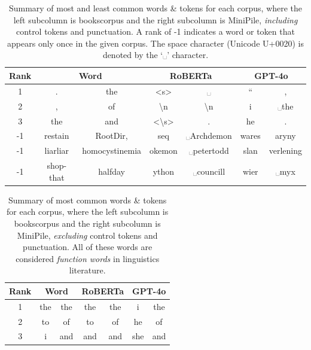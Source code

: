 \documentclass[11pt]{article}
\begin{document}
\begin{table}
    \centering
    \begin{tabular}{|c|c|c|c|c|c|c|}
        \hline
        \textbf{Rank} & \multicolumn{2}{c|}{\textbf{Word}} & \multicolumn{2}{c|}{\textbf{RoBERTa}} & \multicolumn{2}{c|}{\textbf{GPT-4o}}  \\
        \hline
        1 & . & the & <s> & ␣ & `` & , \\
        \hline
        2 & , & of & \textbackslash n & \textbackslash n & i & ␣the \\
        \hline
        3 & the & and & <\textbackslash s> & . & he & . \\
        \hline
        -1 & restain & RootDir, & seq & ␣Archdemon & wares & aryny \\
        \hline
        -1 & liarliar & homocystinemia & okemon & ␣petertodd & slan & verlening \\
        \hline
        -1 & shop-that & halfday & ython & ␣councill & wier & ␣myx \\
        \hline
    \end{tabular}
    \caption{Summary of most and least common words \& tokens for each corpus, where the left subcolumn is bookscorpus and the right subcolumn is MiniPile, \textit{including} control tokens and punctuation. A rank of -1 indicates a word or token that appears only once in the given corpus. The space character (Unicode U+0020) is denoted by the `␣' character. }
    \label{tbl:token ranks}
\end{table}

\begin{table}
    \centering
    \begin{tabular}{|c|c|c|c|c|c|c|}
        \hline
        \textbf{Rank} & \multicolumn{2}{c|}{\textbf{Word}} & \multicolumn{2}{c|}{\textbf{RoBERTa}} & \multicolumn{2}{c|}{\textbf{GPT-4o}}  \\
        \hline
        1 & the & the & the & the & i & the \\
        \hline
        2 & to & of & to & of & he & of \\
        \hline
        3 & i & and & and & and & she & and \\
        \hline
    \end{tabular}
    \caption{Summary of most common words \& tokens for each corpus, where the left subcolumn is bookscorpus and the right subcolumn is MiniPile, \textit{excluding} control tokens and punctuation. All of these words are considered \textit{function words} in linguistics literature.}
    \label{tbl:token ranks no control}
\end{table}
\end{document}
